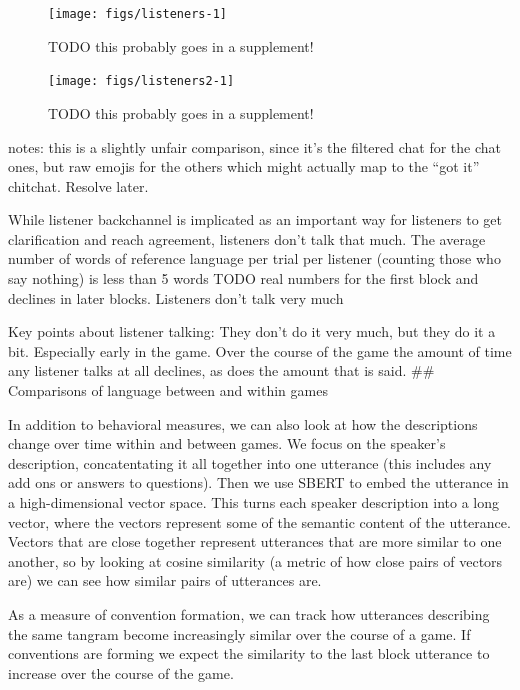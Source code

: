 \documentclass[
  english,
  a4paper,
]{article}
\begin{document}
\begin{figure}[t!]

{\centering \texttt{[image: figs/listeners-1]} 

}

\caption{TODO this probably goes in a supplement! }\label{fig:listeners}
\end{figure}

\begin{figure}[t!]

{\centering \texttt{[image: figs/listeners2-1]} 

}

\caption{TODO this probably goes in a supplement! }\label{fig:listeners2}
\end{figure}

notes: this is a slightly unfair comparison, since it's the filtered chat for the chat ones, but raw emojis for the others which might actually map to the ``got it'' chitchat. Resolve later.

While listener backchannel is implicated as an important way for listeners to get clarification and reach agreement, listeners don't talk that much. The average number of words of reference language per trial per listener (counting those who say nothing) is less than 5 words TODO real numbers for the first block and declines in later blocks.
Listeners don't talk very much

Key points about listener talking: They don't do it very much, but they do it a bit. Especially early in the game. Over the course of the game the amount of time any listener talks at all declines, as does the amount that is said.
\#\# Comparisons of language between and within games

In addition to behavioral measures, we can also look at how the descriptions change over time within and between games. We focus on the speaker's description, concatentating it all together into one utterance (this includes any add ons or answers to questions). Then we use SBERT to embed the utterance in a high-dimensional vector space. This turns each speaker description into a long vector, where the vectors represent some of the semantic content of the utterance. Vectors that are close together represent utterances that are more similar to one another, so by looking at cosine similarity (a metric of how close pairs of vectors are) we can see how similar pairs of utterances are.

As a measure of convention formation, we can track how utterances describing the same tangram become increasingly similar over the course of a game. If conventions are forming we expect the similarity to the last block utterance to increase over the course of the game.
\end{document}
